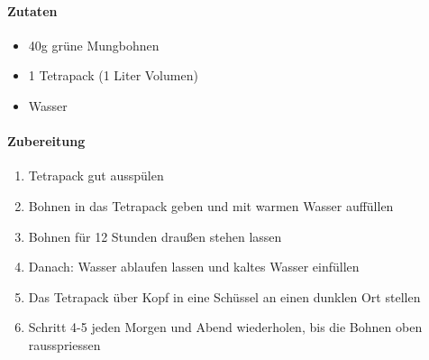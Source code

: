 \clearpage
{}
\paragraph{Zutaten}
\begin{itemize}[noitemsep]
	\item 40g grüne Mungbohnen
	\item 1 Tetrapack (1 Liter Volumen)
	\item Wasser
\end{itemize}


\paragraph{Zubereitung}
\begin{enumerate}[noitemsep]
	\item Tetrapack gut ausspülen
	\item Bohnen in das Tetrapack geben und mit warmen Wasser auffüllen
	\item Bohnen für 12 Stunden draußen stehen lassen
	\item Danach: Wasser ablaufen lassen und kaltes Wasser einfüllen
	\item Das Tetrapack über Kopf in eine Schüssel an einen dunklen Ort stellen
	\item Schritt 4-5 jeden Morgen und Abend wiederholen, bis die Bohnen oben rausspriessen
\end{enumerate}